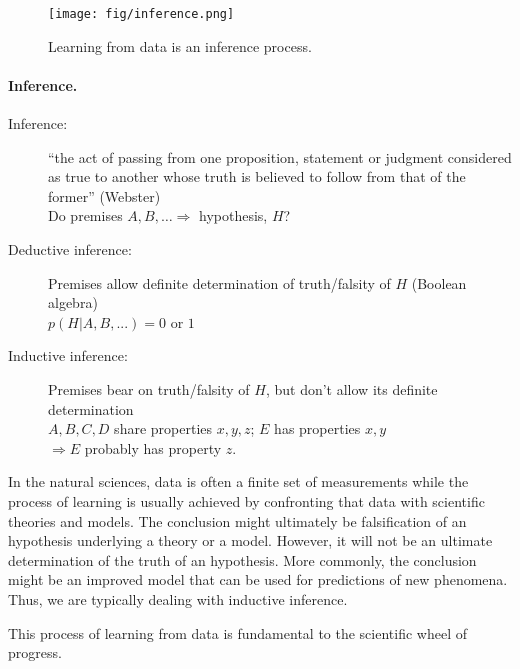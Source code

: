 \documentclass[%
oneside,                 %
final,                   %
10pt]{article}
\newenvironment{block_mdfboxadmon}[1][]{
\begin{block_mdfboxmdframed}[frametitle=#1]
}
{
\end{block_mdfboxmdframed}
}
\begin{document}
\begin{figure}[!ht]  %
  \centerline{\texttt{[image: fig/inference.png]}}
  \caption{
  Learning from data is an inference process. \label{fig-inference}
  }
\end{figure}


\paragraph{Inference.}

\begin{block_mdfboxadmon}[]
\begin{description}
\item[Inference:] 
  ``the act of passing from one proposition, statement or judgment considered as true to another whose truth is believed to follow from that of the former'' (Webster) \\
  Do premises $A, B, \ldots \Rightarrow$ hypothesis, $H$? 

\item[Deductive inference:] 
  Premises allow definite determination of truth/falsity of $H$ (Boolean algebra) \\
  $p(H|A,B,...) = 0$ or $1$

\item[Inductive inference:] 
  Premises bear on truth/falsity of $H$, but don’t allow its definite determination\\
  $A, B, C, D$ share properties $x, y, z$; $E$ has properties $x, y$\\
  $\Rightarrow E$ probably has property $z$.
\end{description}

\noindent
\end{block_mdfboxadmon} %



In the natural sciences, data is often a finite set of measurements while the process of learning is usually achieved by confronting that data with scientific theories and models. The conclusion might ultimately be falsification of an hypothesis underlying a theory or a model. However, it will not be an ultimate determination of the truth of an hypothesis. More commonly, the conclusion might be an improved model that can be used for predictions of new phenomena. Thus, we are typically dealing with inductive inference.

This process of learning from data is fundamental to the scientific wheel of progress.
\end{document}
